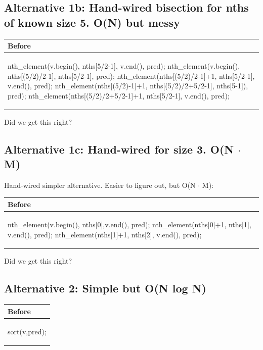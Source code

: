 \subsection*{Alternative 1b: Hand-wired bisection for nths of known size 5. O(N) but messy}

\hspace{3ex}\begin{tabular}{|l|} 
  \hline 
  \textbf{Before} \\
  \hline 
\begin{codeblock} 
nth_element(v.begin(), nths[5/2-1], v.end(), pred);
nth_element(v.begin(), nths[(5/2)/2-1], nths[5/2-1], pred);
nth_element(nths[(5/2)/2-1]+1, nths[5/2-1], v.end(), pred);
nth_element(nths[(5/2)-1]+1, nths[(5/2)/2+5/2-1], nths[5-1]), pred);
nth_element(nths[(5/2)/2+5/2-1]+1, nths[5/2-1], v.end(), pred);
\end{codeblock} 
\\
\hline 
\end{tabular} 

Did we get this right?

\subsection*{Alternative 1c: Hand-wired for size 3. O(N $\cdot$ M)}

Hand-wired simpler alternative. Easier to figure out, but O(N $\cdot$ M):

\hspace{3ex}\begin{tabular}{|l|} 
  \hline 
  \textbf{Before} \\
  \hline 
\begin{codeblock} 
nth_element(v.begin(), nths[0],v.end(), pred);
nth_element(nths[0]+1, nths[1], v.end(), pred);
nth_element(nths[1]+1, nths[2], v.end(), pred);
\end{codeblock} 
\\
\hline 
\end{tabular} 

Did we get this right?

\subsection*{Alternative 2: Simple but O(N log N)}

\hspace{3ex}\begin{tabular}{|l|} 
  \hline 
  \textbf{Before} \\
  \hline 
\begin{codeblock} 
sort(v,pred);
\end{codeblock}
\\
\hline 
\end{tabular} 


